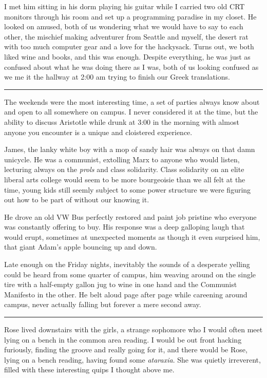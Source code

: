 \documentclass[ebook, 10pt, openright, onecolumn]{memoir}
\newcommand*\td[1]{
  \todo[inline]{
     #1 
  }
}
\newcommand*\starbreak{\fancybreak*{\Large{* * *}}}
\newcommand*\finish{\td{ ----- Finish this section -----}}
\begin{document}
I met him sitting in his dorm playing his guitar while I carried two
old CRT monitors through his room and set up a programming paradise in my
closet.  He looked on amused, both of us wondering what we would have to say to
each other, the mischief making adventurer from Seattle and myself, the desert
rat with too much computer gear and a love for the hackysack.  Turns out, we
both liked wine and books, and this was enough.  Despite everything, he was just
as confused about what he was doing there as I was, both of us looking confused
as we me it the hallway at 2:00 am trying to finish our Greek translations.

\finish
\starbreak

The weekends were the most interesting time, a set of parties always know about
and open to all somewhere on campus.  I never considered it at the time, but the
ability to discuss Aristotle while drunk at 3:00 in the morning with almost
anyone you encounter is a unique and cloistered experience.  

James, the lanky white boy with a mop of sandy hair was always on that damn
unicycle.  He was a communist, extolling Marx to anyone who would listen,
lecturing always on the \textit{prols} and class solidarity.  Class solidarity
on an elite liberal arts college would seem to be more bourgeoisie than we all
felt at the time, young kids still seemly subject to some power structure we
were figuring out how to be part of without our knowing it.  

He drove an old VW Bus perfectly restored and paint job pristine who everyone
was constantly offering to buy.  His response was a deep galloping laugh that
would erupt, sometimes at unexpected moments as though it even surprised him,
that giant Adam's apple bouncing up and down.  

Late enough on the Friday nights, inevitably the sounds of a desperate yelling
could be heard from some quarter of campus, him weaving around on the single
tire with a half-empty gallon jug to wine in one hand and the Communist
Manifesto in the other.  He belt aloud page after page while careening around
campus, never actually falling but forever a mere second away.

\starbreak

Rose lived downstairs with the girls, a strange sophomore who I would often meet
lying on a bench in the common area reading.  I would be out front hacking
furiously, finding the groove and really going for it, and there would be Rose,
lying on a bench reading, having found some \textit{ataraxia}.  She was quietly
irreverent, filled with these interesting quips I thought above me.  
\end{document}
